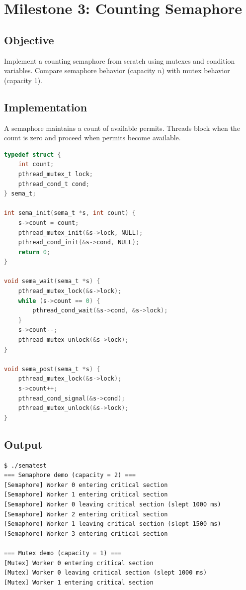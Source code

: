 \documentclass[12pt,a4paper]{article}
\begin{document}
\clearpage

\section{Milestone 3: Counting Semaphore}

\subsection{Objective}
Implement a counting semaphore from scratch using mutexes and condition variables. Compare semaphore behavior (capacity $n$) with mutex behavior (capacity 1).

\subsection{Implementation}
A semaphore maintains a count of available permits. Threads block when the count is zero and proceed when permits become available.

\begin{lstlisting}[language=C, caption={Semaphore Implementation}]
typedef struct {
    int count;
    pthread_mutex_t lock;
    pthread_cond_t cond;
} sema_t;

int sema_init(sema_t *s, int count) {
    s->count = count;
    pthread_mutex_init(&s->lock, NULL);
    pthread_cond_init(&s->cond, NULL);
    return 0;
}

void sema_wait(sema_t *s) {
    pthread_mutex_lock(&s->lock);
    while (s->count == 0) {
        pthread_cond_wait(&s->cond, &s->lock);
    }
    s->count--;
    pthread_mutex_unlock(&s->lock);
}

void sema_post(sema_t *s) {
    pthread_mutex_lock(&s->lock);
    s->count++;
    pthread_cond_signal(&s->cond);
    pthread_mutex_unlock(&s->lock);
}
\end{lstlisting}

\subsection{Output}
\begin{tcolorbox}[colback=green!5!white,colframe=green!75!black,title=Program Output]
\begin{verbatim}
$ ./sematest
=== Semaphore demo (capacity = 2) ===
[Semaphore] Worker 0 entering critical section
[Semaphore] Worker 1 entering critical section
[Semaphore] Worker 0 leaving critical section (slept 1000 ms)
[Semaphore] Worker 2 entering critical section
[Semaphore] Worker 1 leaving critical section (slept 1500 ms)
[Semaphore] Worker 3 entering critical section

=== Mutex demo (capacity = 1) ===
[Mutex] Worker 0 entering critical section
[Mutex] Worker 0 leaving critical section (slept 1000 ms)
[Mutex] Worker 1 entering critical section
\end{verbatim}
\end{tcolorbox}
\end{document}
